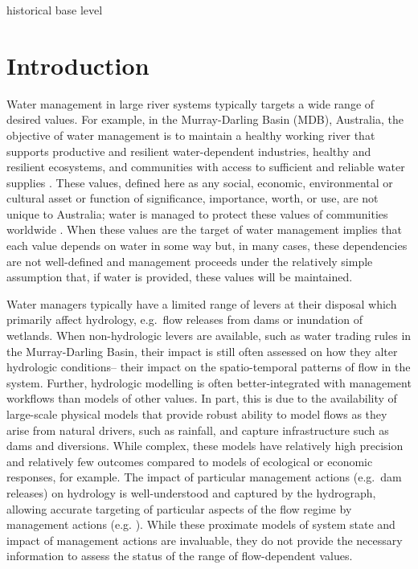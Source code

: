 \documentclass[
  number]{elsarticle}
\begin{document}
historical base level

\hypertarget{introduction}{%
\section{Introduction}\label{introduction}}

Water management in large river systems typically targets a wide range
of desired values. For example, in the Murray-Darling Basin (MDB),
Australia, the objective of water management is to maintain a healthy
working river that supports productive and resilient water-dependent
industries, healthy and resilient ecosystems, and communities with
access to sufficient and reliable water supplies
\citep{murray-darlingbasinauthority2011}. These values, defined here as
any social, economic, environmental or cultural asset or function of
significance, importance, worth, or use, are not unique to Australia;
water is managed to protect these values of communities worldwide
\citep[e.g.][]{stern2019, kaye-blake2014} \citep[\emph{;
\citep{connor2014}}]{ziolkowska2016}. When these values are the target
of water management implies that each value depends on water in some way
but, in many cases, these dependencies are not well-defined and
management proceeds under the relatively simple assumption that, if
water is provided, these values will be maintained.

Water managers typically have a limited range of levers at their
disposal which primarily affect hydrology, e.g.~flow releases from dams
or inundation of wetlands. When non-hydrologic levers are available,
such as water trading rules in the Murray-Darling Basin, their impact is
still often assessed on how they alter hydrologic conditions-- their
impact on the spatio-temporal patterns of flow in the system. Further,
hydrologic modelling is often better-integrated with management
workflows than models of other values. In part, this is due to the
availability of large-scale physical models that provide robust ability
to model flows as they arise from natural drivers, such as rainfall, and
capture infrastructure such as dams and diversions. While complex, these
models have relatively high precision and relatively few outcomes
compared to models of ecological or economic responses, for example. The
impact of particular management actions (e.g.~dam releases) on hydrology
is well-understood and captured by the hydrograph, allowing accurate
targeting of particular aspects of the flow regime by management actions
(e.g. \citep[\emph{; \citep{Loire2021}}]{singer2007}). While these
proximate models of system state and impact of management actions are
invaluable, they do not provide the necessary information to assess the
status of the range of flow-dependent values.
\end{document}

